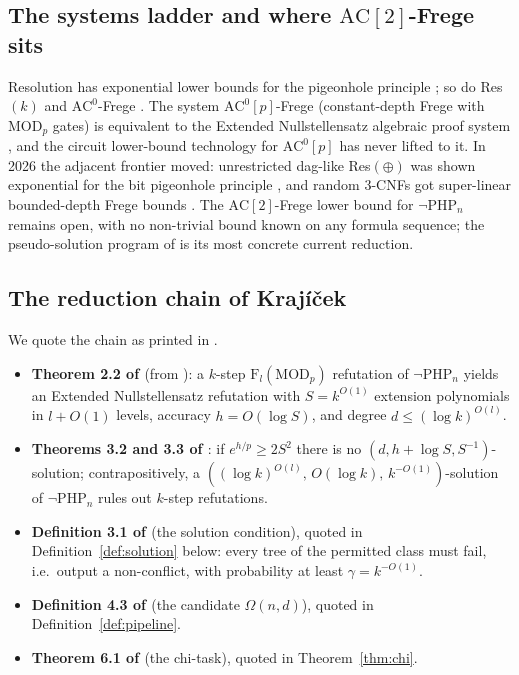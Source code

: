 \documentclass[11pt]{article}
\theoremstyle{definition}
\theoremstyle{remark}
\newcommand{\PHPn}{\neg\mathrm{PHP}_n}
\newcommand{\AC}{\mathrm{AC}}
\begin{document}
\subsection{The systems ladder and where $\AC[2]$-Frege sits}

Resolution has exponential lower bounds for the pigeonhole principle
\cite{Haken85}; so do Res$(k)$ and $\AC^0$-Frege \cite{Ajtai94}.  The
system $\AC^0[p]$-Frege (constant-depth Frege with $\mathrm{MOD}_p$
gates) is equivalent to the Extended Nullstellensatz algebraic proof
system \cite{Kra19}, and the circuit lower-bound technology for
$\AC^0[p]$ \cite{Smolensky87} has never lifted to it.  In 2026 the
adjacent frontier moved: unrestricted dag-like Res$(\oplus)$ was shown
exponential for the bit pigeonhole principle \cite{resxor26}, and random
3-CNFs got super-linear bounded-depth Frege bounds \cite{randomcnf26}.
The $\AC[2]$-Frege lower bound for $\PHPn$ remains open, with no
non-trivial bound known on any formula sequence; the pseudo-solution
program of \cite{Kra26} is its most concrete current reduction.

\subsection{The reduction chain of Kraj\'i\v{c}ek}

We quote the chain as printed in \cite{Kra26}.

\begin{itemize}
\item \textbf{Theorem 2.2 of \cite{Kra26}} (from \cite{BIKPPS97}): a
$k$-step $\mathrm{F}_l(\mathrm{MOD}_p)$ refutation of $\PHPn$ yields an
Extended Nullstellensatz refutation with $S=k^{O(1)}$ extension
polynomials in $l+O(1)$ levels, accuracy $h=O(\log S)$, and degree
$d\le(\log k)^{O(l)}$.
\item \textbf{Theorems 3.2 and 3.3 of \cite{Kra26}}: if $e^{h/p}\ge 2S^2$
there is no $(d,h+\log S,S^{-1})$-solution; contrapositively, a
$((\log k)^{O(l)},\,O(\log k),\,k^{-O(1)})$-solution of $\PHPn$ rules out
$k$-step refutations.
\item \textbf{Definition 3.1 of \cite{Kra26}} (the solution condition),
quoted in Definition~\ref{def:solution} below: every tree of the
permitted class must fail, i.e.\ output a non-conflict, with probability
at least $\gamma=k^{-O(1)}$.
\item \textbf{Definition 4.3 of \cite{Kra26}} (the candidate
$\Omega(n,d)$), quoted in Definition~\ref{def:pipeline}.
\item \textbf{Theorem 6.1 of \cite{Kra26}} (the chi-task), quoted in
Theorem~\ref{thm:chi}.
\end{itemize}
\end{document}
